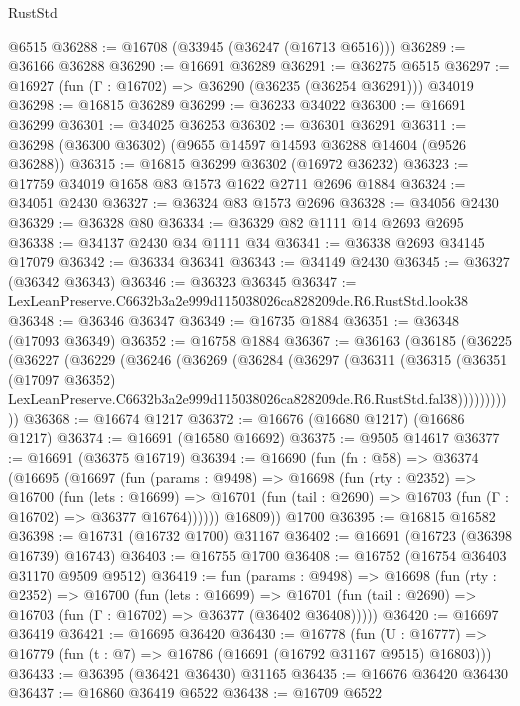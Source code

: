 \begin{lexlean}{RustStd}
\begin{coremodule}
    @6515
@36288 := @16708 (@33945 (@36247 (@16713 @6516)))
@36289 := @36166 @36288
@36290 := @16691 @36289
@36291 := @36275 @6515
@36297 := @16927 (fun (Γ : @16702) => @36290 (@36235 (@36254 @36291))) @34019
@36298 := @16815 @36289
@36299 := @36233 @34022
@36300 := @16691 @36299
@36301 := @34025 @36253
@36302 := @36301 @36291
@36311 := @36298 (@36300 @36302) (@9655 @14597 @14593 @36288 @14604 (@9526 @36288))
@36315 := @16815 @36299 @36302 (@16972 @36232)
@36323 := @17759 @34019 @1658 @83 @1573 @1622 @2711 @2696 @1884
@36324 := @34051 @2430
@36327 := @36324 @83 @1573 @2696
@36328 := @34056 @2430
@36329 := @36328 @80
@36334 := @36329 @82 @1111 @14 @2693 @2695
@36338 := @34137 @2430 @34 @1111 @34
@36341 := @36338 @2693 @34145 @17079
@36342 := @36334 @36341
@36343 := @34149 @2430
@36345 := @36327 (@36342 @36343)
@36346 := @36323 @36345
@36347 := LexLeanPreserve.C6632b3a2e999d115038026ca828209de.R6.RustStd.look38
@36348 := @36346 @36347
@36349 := @16735 @1884
@36351 := @36348 (@17093 @36349)
@36352 := @16758 @1884
@36367 := @36163
    (@36185
      (@36225
        (@36227
          (@36229
            (@36246
              (@36269
                (@36284
                  (@36297
                    (@36311
                      (@36315
                        (@36351
                          (@17097 @36352)
                          LexLeanPreserve.C6632b3a2e999d115038026ca828209de.R6.RustStd.fal38)))))))))))
@36368 := @16674 @1217
@36372 := @16676 (@16680 @1217) (@16686 @1217)
@36374 := @16691 (@16580 @16692)
@36375 := @9505 @14617
@36377 := @16691 (@36375 @16719)
@36394 := @16690
    (fun (fn : @58) =>
    @36374
      (@16695
        (@16697
          (fun (params : @9498) =>
          @16698
            (fun (rty : @2352) =>
            @16700
              (fun (lets : @16699) =>
              @16701 (fun (tail : @2690) => @16703 (fun (Γ : @16702) => @36377 @16764))))))
        @16809))
    @1700
@36395 := @16815 @16582
@36398 := @16731 (@16732 @1700) @31167
@36402 := @16691 (@16723 (@36398 @16739) @16743)
@36403 := @16755 @1700
@36408 := @16752 (@16754 @36403 @31170 @9509 @9512)
@36419 := fun (params : @9498) =>
  @16698
    (fun (rty : @2352) =>
    @16700
      (fun (lets : @16699) =>
      @16701 (fun (tail : @2690) => @16703 (fun (Γ : @16702) => @36377 (@36402 @36408)))))
@36420 := @16697 @36419
@36421 := @16695 @36420
@36430 := @16778
    (fun (U : @16777) => @16779 (fun (t : @7) => @16786 (@16691 (@16792 @31167 @9515) @16803)))
@36433 := @36395 (@36421 @36430) @31165
@36435 := @16676 @36420 @36430
@36437 := @16860 @36419 @6522
@36438 := @16709 @6522

\end{coremodule}
\end{lexlean}
